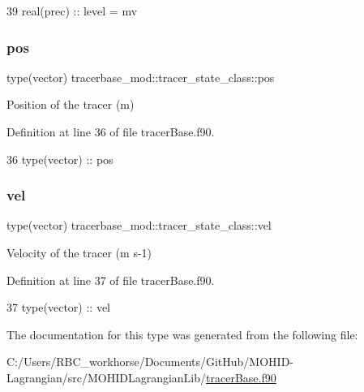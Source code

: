 \begin{DoxyCode}
39         \textcolor{keywordtype}{real(prec)} :: level = mv                
\end{DoxyCode}
\mbox{\label{structtracerbase__mod_1_1tracer__state__class_a184b3ecbe519a6cc7468fa3060131ce0}} 
\subsubsection{\texorpdfstring{pos}{pos}}
{\footnotesize\ttfamily type(vector) tracerbase\+\_\+mod\+::tracer\+\_\+state\+\_\+class\+::pos\hspace{0.3cm}{\ttfamily [private]}}



Position of the tracer (m) 



Definition at line 36 of file tracer\+Base.\+f90.


\begin{DoxyCode}
36         \textcolor{keywordtype}{type}(vector) :: pos
\end{DoxyCode}
\mbox{\label{structtracerbase__mod_1_1tracer__state__class_ae94928588f703077bae9de12c8e9d14b}} 
\subsubsection{\texorpdfstring{vel}{vel}}
{\footnotesize\ttfamily type(vector) tracerbase\+\_\+mod\+::tracer\+\_\+state\+\_\+class\+::vel\hspace{0.3cm}{\ttfamily [private]}}



Velocity of the tracer (m s-\/1) 



Definition at line 37 of file tracer\+Base.\+f90.


\begin{DoxyCode}
37         \textcolor{keywordtype}{type}(vector) :: vel
\end{DoxyCode}


The documentation for this type was generated from the following file\+:\begin{DoxyCompactItemize}
\item 
C\+:/\+Users/\+R\+B\+C\+\_\+workhorse/\+Documents/\+Git\+Hub/\+M\+O\+H\+I\+D-\/\+Lagrangian/src/\+M\+O\+H\+I\+D\+Lagrangian\+Lib/\mbox{\hyperlink{tracer_base_8f90}{tracer\+Base.\+f90}}\end{DoxyCompactItemize}
